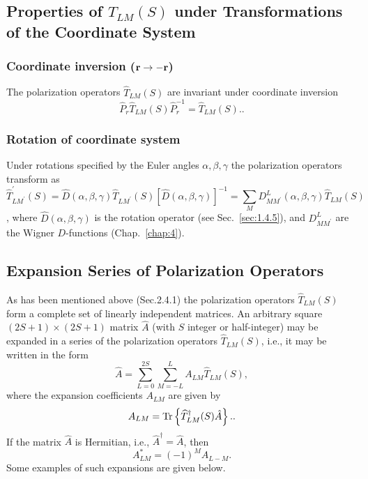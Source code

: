 \subsection{Properties of $\widehat{T}_{L M}(S)$ under Transformations of the Coordinate System}
\subsubsection{Coordinate inversion ($\mathbf{r} \rightarrow-\mathbf{r}$)}

The polarization operators $\widehat{T}_{L M}(S)$ are invariant under coordinate inversion
\begin{equation}
\widehat{P}_{r} \widehat{T}_{L M}(S) \widehat{P}_{r}^{-1}=\widehat{T}_{L M}(S) . \label{eq:2:4:11}.
\end{equation}
\subsubsection{Rotation of coordinate system}

Under rotations specified by the Euler angles $\alpha, \beta, \gamma$ the polarization operators transform as
\begin{equation}
\widehat{T}_{L M^{\prime}}^{\prime}(S)=\widehat{D}(\alpha, \beta, \gamma) \widehat{T}_{L M^{\prime}}(S)[\widehat{D}(\alpha, \beta, \gamma)]^{-1}=\sum_{M} D_{M M^{\prime}}^{L}(\alpha, \beta, \gamma) \widehat{T}_{L M}(S) \label{eq:2:4:12}
\end{equation},
where $\widehat{D}(\alpha, \beta, \gamma)$ is the rotation operator (see Sec.~\ref{sec:1.4.5}), and $D_{M M^{\prime}}^{L}$ are the Wigner $D$-functions (Chap.~\ref{chap:4}).

\subsection{Expansion Series of Polarization Operators}
As has been mentioned above (Sec.2.4.1) the polarization operators $\hat{T}_{L M}(S)$ form a complete set of linearly independent matrices. An arbitrary square $(2 S+1) \times(2 S+1)$ matrix $\hat{A}$ (with $S$ integer or half-integer) may be expanded in a series of the polarization operators $\widehat{T}_{L M}(S)$, i.e., it may be written in the form
\begin{equation}
\widehat{A}=\sum_{L=0}^{2 S} \sum_{M=-L}^{L} A_{L M} \widehat{T}_{L M}(S) \label{eq:2:4:13},
\end{equation}
where the expansion coefficients $A_{L M}$ are given by
\begin{equation}
A_{L M}=\operatorname{Tr} \left\{\widehat{T}_{L M}^{\dagger}(S) \hat{A}\right\} . \label{eq:2:4:14}.
\end{equation}
If the matrix $\widehat{A}$ is Hermitian, i.e., $\widehat{A}^{\dagger}=\widehat{A}$, then
\begin{equation}
A_{L M}^{*}=(-1)^{M} A_{L-M} \label{eq:2:4:15}.
\end{equation}
Some examples of such expansions are given below.
